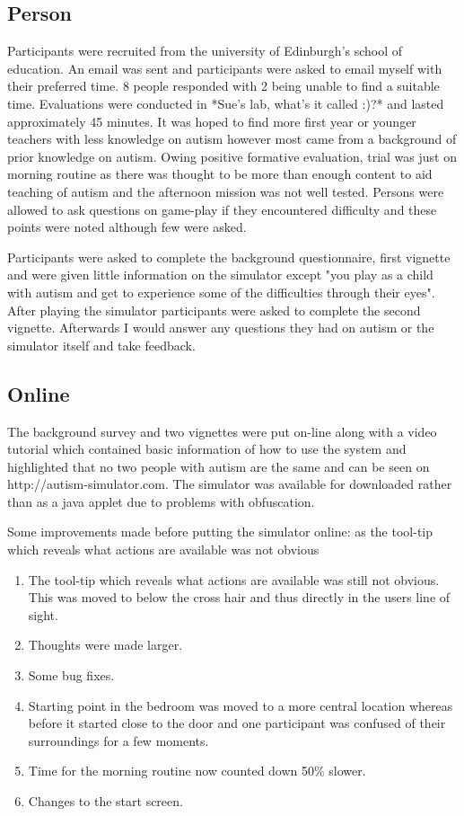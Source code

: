 \documentclass[11pt]{report}
\begin{document}
\subsection{Person}
Participants were recruited from the university of Edinburgh's school of education. An email was sent and participants were asked to email myself with their preferred time. 8 people responded with 2 being unable to find a suitable time. Evaluations were conducted in *Sue's lab, what's it called :)?* and lasted approximately 45 minutes. It was hoped to find more first year or younger teachers with less knowledge on autism however most came from a background of prior knowledge on autism. Owing positive formative evaluation, trial was just on morning routine as there was thought to be more than enough content to aid teaching of autism and the afternoon mission was not well tested. Persons were allowed to ask questions on game-play if they encountered difficulty and these points were noted although few were asked.

Participants were asked to complete the background questionnaire, first vignette and were given little information on the simulator except "you play as a child with autism and get to experience some of the difficulties through their eyes". After playing the simulator participants were asked to complete the second vignette. Afterwards I would answer any questions they had on autism or the simulator itself and take feedback. 

\subsection{Online}

The background survey and two vignettes were put on-line along with a video tutorial which contained basic information of how to use the system and highlighted that no two people with autism are the same and can be seen on http://autism-simulator.com. The simulator was available for downloaded rather than as a java applet due to problems with obfuscation. 

Some improvements made before putting the simulator online: as the tool-tip which reveals what actions are available was not obvious

\begin{enumerate}
\item The tool-tip which reveals what actions are available was still not obvious. This was moved to below the cross hair and thus directly in the users line of sight.
\item Thoughts were made larger.
\item Some bug fixes. 
\item Starting point in the bedroom was moved to a more central location whereas before it started close to the door and one participant was confused of their surroundings for a few moments.
\item Time for the morning routine now counted down 50\% slower.
\item Changes to the start screen.
\end{enumerate}
\end{document}
